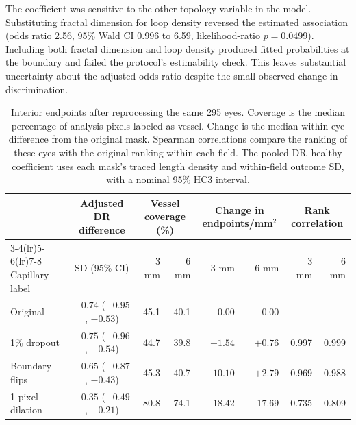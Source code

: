 \documentclass[letterpaper]{article}
\begin{document}
The coefficient was sensitive to the other topology variable in the model. Substituting fractal dimension for loop density reversed the estimated association (odds ratio 2.56, 95\% Wald CI 0.996 to 6.59, likelihood-ratio $p=0.0499$). Including both fractal dimension and loop density produced fitted probabilities at the boundary and failed the protocol's estimability check. This leaves substantial uncertainty about the adjusted odds ratio despite the small observed change in discrimination.

\begin{table}[t]
\centering
\begin{tabular}{lcrrrrrr}
\toprule
 & Adjusted DR difference & \multicolumn{2}{c}{Vessel coverage (\%)} & \multicolumn{2}{c}{Change in endpoints/mm$^2$} & \multicolumn{2}{c}{Rank correlation}\\
\cmidrule(lr){3-4}\cmidrule(lr){5-6}\cmidrule(lr){7-8}
Capillary label & SD (95\% CI) & 3 mm & 6 mm & 3 mm & 6 mm & 3 mm & 6 mm\\
\midrule
Original & $-0.74$ ($-0.95$, $-0.53$) & 45.1 & 40.1 & 0.00 & 0.00 & --- & ---\\
1\% dropout & $-0.75$ ($-0.96$, $-0.54$) & 44.7 & 39.8 & $+1.54$ & $+0.76$ & 0.997 & 0.999\\
Boundary flips & $-0.65$ ($-0.87$, $-0.43$) & 45.3 & 40.7 & $+10.10$ & $+2.79$ & 0.969 & 0.988\\
1-pixel dilation & $-0.35$ ($-0.49$, $-0.21$) & 80.8 & 74.1 & $-18.42$ & $-17.69$ & 0.735 & 0.809\\
\bottomrule
\end{tabular}
\caption{Interior endpoints after reprocessing the same 295 eyes. Coverage is the median percentage of analysis pixels labeled as vessel. Change is the median within-eye difference from the original mask. Spearman correlations compare the ranking of these eyes with the original ranking within each field. The pooled DR--healthy coefficient uses each mask's traced length density and within-field outcome SD, with a nominal 95\% HC3 interval.}
\label{tab:pixel}
\end{table}
\end{document}
